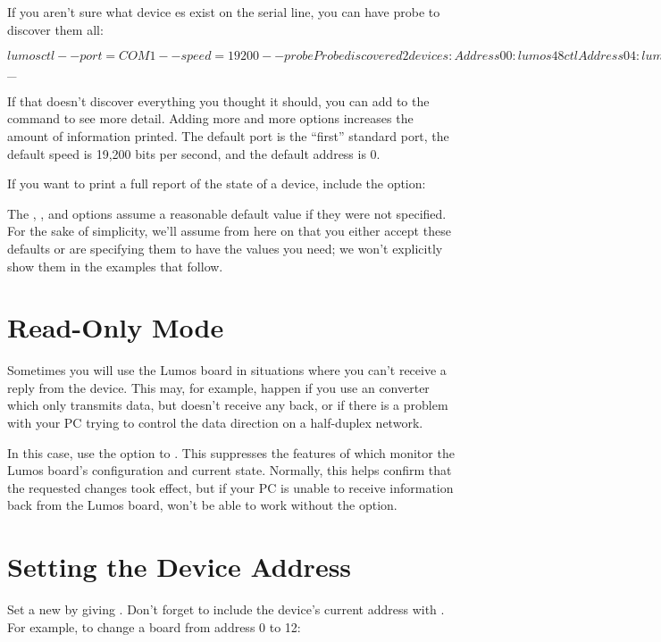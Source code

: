\documentclass[letterpaper,twoside,onecolumn,openright,final]{memoir}
\begin{document}
If you aren't sure what device es exist on the serial line, you can have  
probe to discover them all:
\begin{SourceCode}
$ lumosctl --port=COM1 --speed=19200 --probe
Probe discovered 2 devices:
Address 00: lumos48ctl
Address 04: lumos24dc
$ _
\end{SourceCode}

If that doesn't discover everything you thought it should, you can add  to the command
to see more detail.  Adding more and more  options increases the amount of information
printed.  The default port is the ``first'' standard port, the default speed is 19,200 bits per second,
and the default address is 0.

If you want to print a full report of the state of a device, include the  option:

The , , and  options assume a reasonable default value if
they were not specified.  For the sake of simplicity, we'll assume from here on that you either
accept these defaults or are specifying them to have the values you need; we won't explicitly
show them in the examples that follow.

\section{Read-Only Mode}
Sometimes you will use the Lumos board in situations where you can't receive a reply from the device.
This may, for example, happen if you use an  converter which only transmits data, but
doesn't receive any back, or if there is a problem with your PC trying to control the data direction
on a half-duplex network.

In this case, use the  option to .  This suppresses the features of
 which monitor the Lumos board's configuration and current state.  Normally, this helps
confirm that the requested changes took effect, but if your PC is unable to receive information back
from the Lumos board,  won't be able to work without the  option.

\section{Setting the Device Address}
Set a new  by giving .  Don't forget to include the
device's current address with .  For example, to change a board
from address 0 to 12:
\end{document}
